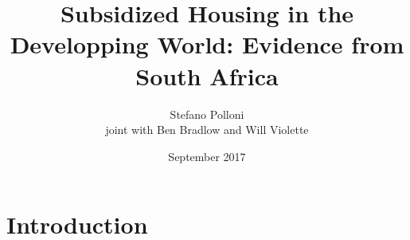 \documentclass[aspectratio=149]{beamer}
\title{ Subsidized Housing in the Developping World: Evidence from South Africa } %
\author{Stefano Polloni \\
joint with Ben Bradlow and Will Violette}
\date{September 2017} %
\begin{document}
\beamertemplatenavigationsymbolsempty

\begin{frame}
\titlepage %
\end{frame}


\section{Introduction}
\end{document}
